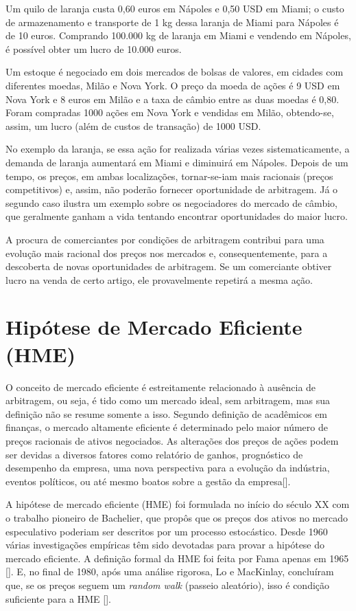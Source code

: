 \documentclass[brazil,ruledheader]{abnt}
\renewcommand{\cite}[1]{[\citeonline{#1}]}
\begin{document}
\begin{citacao}
Um quilo de laranja custa 0,60 euros em Nápoles e 0,50 USD em Miami; o
custo de armazenamento e transporte de 1 kg dessa laranja de Miami para
Nápoles é de 10 euros. Comprando 100.000 kg de laranja em Miami e
vendendo em Nápoles, é possível obter um lucro de 10.000 euros.


Um estoque é negociado em dois mercados de bolsas de valores, em cidades
com diferentes moedas, Milão e Nova York. O preço da moeda de ações é 9
USD em Nova York e 8 euros em Milão e a taxa de câmbio entre as duas
moedas é 0,80. Foram compradas 1000 ações em Nova York e vendidas em
Milão, obtendo-se, assim, um lucro (além de custos de transação) de 1000
USD.
\end{citacao}

No exemplo da laranja, se essa ação for realizada várias vezes
sistematicamente, a demanda de laranja aumentará em Miami e diminuirá em
Nápoles. Depois de um tempo, os preços, em ambas localizações, tornar-se-iam
mais racionais (preços competitivos) e, assim, não poderão fornecer oportunidade
de arbitragem. Já o segundo caso ilustra um exemplo sobre os negociadores
do mercado de câmbio, que geralmente ganham a vida tentando encontrar
oportunidades do maior lucro.

A procura de comerciantes por condições de arbitragem contribui para uma
evolução mais racional dos preços nos mercados e, consequentemente, para
a descoberta de novas oportunidades de arbitragem. Se um comerciante obtiver
lucro  na venda de certo artigo, ele provavelmente repetirá a mesma ação.

\section{Hipótese de Mercado Eficiente (HME)}

O conceito de mercado eficiente é estreitamente relacionado à ausência
de arbitragem, ou seja, é tido como um mercado ideal, sem arbitragem, mas
sua definição não se resume somente a isso. Segundo definição de acadêmicos
em finanças, o mercado altamente eficiente é determinado pelo maior número
de preços racionais de ativos negociados. As alterações dos preços de ações
podem ser devidas a diversos fatores como relatório de ganhos, 
prognóstico de desempenho da empresa, uma nova perspectiva para a evolução
da indústria, eventos políticos, ou até mesmo boatos sobre a gestão da
empresa\cite{Sc05,MaSt00}. 

A hipótese de mercado eficiente (HME) foi formulada no início do século XX
com o trabalho pioneiro de Bachelier, que propôs que os preços dos ativos
no mercado especulativo poderiam ser descritos por um processo estocástico.
Desde 1960 várias investigações empíricas têm sido devotadas para provar
a hipótese do mercado eficiente. A definição formal da HME foi feita por
Fama apenas em 1965 \cite{Sc05}. E, no final de 1980, após uma análise rigorosa,
Lo e MacKinlay, concluíram que, se os preços seguem um \emph{random walk}
(passeio aleatório), isso é condição suficiente para a HME \cite{MaSt00}.
\end{document}
